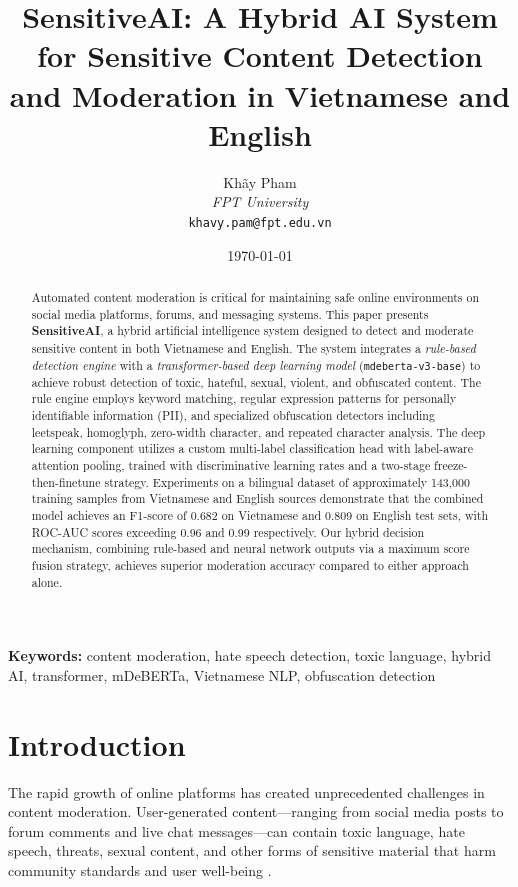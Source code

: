 \documentclass[12pt,a4paper]{article}
\title{\textbf{SensitiveAI: A Hybrid AI System for Sensitive Content Detection and Moderation in Vietnamese and English}}
\author{
    Kh{\~a}y Pham \\
    \textit{FPT University} \\
    \texttt{khavy.pam@fpt.edu.vn}
}
\date{\today}
\begin{document}
\maketitle

\begin{abstract}
Automated content moderation is critical for maintaining safe online environments on social media platforms, forums, and messaging systems.
This paper presents \textbf{SensitiveAI}, a hybrid artificial intelligence system designed to detect and moderate sensitive content in both Vietnamese and English.
The system integrates a \textit{rule-based detection engine} with a \textit{transformer-based deep learning model} (\texttt{mdeberta-v3-base}) to achieve robust detection of toxic, hateful, sexual, violent, and obfuscated content.
The rule engine employs keyword matching, regular expression patterns for personally identifiable information (PII), and specialized obfuscation detectors including leetspeak, homoglyph, zero-width character, and repeated character analysis.
The deep learning component utilizes a custom multi-label classification head with label-aware attention pooling, trained with discriminative learning rates and a two-stage freeze-then-finetune strategy.
Experiments on a bilingual dataset of approximately 143,000 training samples from Vietnamese and English sources demonstrate that the combined model achieves an F1-score of 0.682 on Vietnamese and 0.809 on English test sets, with ROC-AUC scores exceeding 0.96 and 0.99 respectively.
Our hybrid decision mechanism, combining rule-based and neural network outputs via a maximum score fusion strategy, achieves superior moderation accuracy compared to either approach alone.
\end{abstract}

\textbf{Keywords:} content moderation, hate speech detection, toxic language, hybrid AI, transformer, mDeBERTa, Vietnamese NLP, obfuscation detection

\section{Introduction}
\label{sec:introduction}

The rapid growth of online platforms has created unprecedented challenges in content moderation.
User-generated content---ranging from social media posts to forum comments and live chat messages---can contain toxic language, hate speech, threats, sexual content, and other forms of sensitive material that harm community standards and user well-being \cite{zampieri2017automated}.
\end{document}
